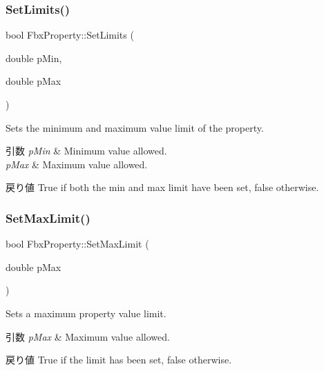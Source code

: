 \subsubsection{\texorpdfstring{Set\+Limits()}{SetLimits()}}
{\footnotesize\ttfamily bool Fbx\+Property\+::\+Set\+Limits (\begin{DoxyParamCaption}\item[{double}]{p\+Min,  }\item[{double}]{p\+Max }\end{DoxyParamCaption})}

Sets the minimum and maximum value limit of the property. 
\begin{DoxyParams}{引数}
{\em p\+Min} & Minimum value allowed. \\
\hline
{\em p\+Max} & Maximum value allowed. \\
\hline
\end{DoxyParams}
\begin{DoxyReturn}{戻り値}
{\ttfamily True} if both the min and max limit have been set, {\ttfamily false} otherwise. 
\end{DoxyReturn}
\mbox{\label{class_fbx_property_af79f0aa4871176b7ca40e16af233a984}} 
\subsubsection{\texorpdfstring{Set\+Max\+Limit()}{SetMaxLimit()}}
{\footnotesize\ttfamily bool Fbx\+Property\+::\+Set\+Max\+Limit (\begin{DoxyParamCaption}\item[{double}]{p\+Max }\end{DoxyParamCaption})}

Sets a maximum property value limit. 
\begin{DoxyParams}{引数}
{\em p\+Max} & Maximum value allowed. \\
\hline
\end{DoxyParams}
\begin{DoxyReturn}{戻り値}
{\ttfamily True} if the limit has been set, {\ttfamily false} otherwise. 
\end{DoxyReturn}
\mbox{\label{class_fbx_property_aa257615c70fd0ff635471216d8aea3ca}} 
